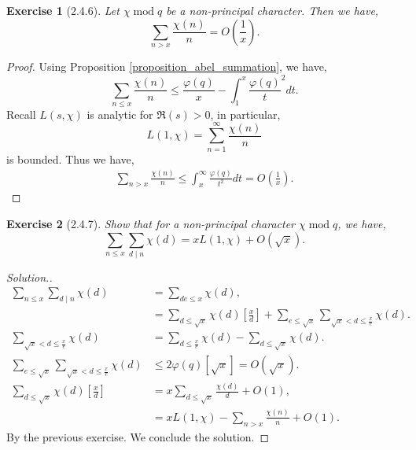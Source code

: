 \documentclass{article}
\newtheorem{exercise}{Exercise}[section]
\DeclareMathOperator{\tmod}{mod}
\begin{document}
\begin{exercise}[2.4.6]
  Let $\chi \tmod q$ be a non-principal character. Then we have,
  \begin{equation*}
    \sum_{n>x}{\frac {\chi(n)} n} = O\left({\frac 1 x}\right).
  \end{equation*}
\end{exercise}
\begin{proof}
  Using Proposition \ref{proposition_abel_summation}, we have,
  \begin{equation*}
    \sum_{n\leq x}{\frac {\chi(n)} n}\leq {\frac {\varphi(q)} x}-\int_1^x {\frac {\varphi(q)} t^2}dt.
  \end{equation*}
  Recall $L(s,\chi)$ is analytic for $\Re(s)>0$, in particular,
  \begin{equation*}
    L(1,\chi)=\sum_{n=1}^\infty{\frac {\chi(n)} n}
  \end{equation*}
  is bounded. Thus we have,
  \begin{align*}
    \sum_{n>x}{\frac {\chi(n)} n}\leq \int_x^\infty {\frac {\varphi(q)} {t^2}}dt = O\left({\frac 1 x}\right).
  \end{align*}
\end{proof}


\begin{exercise}[2.4.7]
  \label{exercise_2.4.7}
  Show that for a non-principal character $\chi\tmod q$, we have,
  \begin{equation*}
    \sum_{n\leq x}\sum_{d\mid n}\chi(d)=xL(1,\chi)+O(\sqrt{x}).
  \end{equation*}
\end{exercise}
\begin{proof}[Solution.]
  \begin{align*}
    \sum_{n\leq x}\sum_{d\mid n}\chi(d)& = \sum_{de\leq x}\chi(d),\\
    & = \sum_{d\leq\sqrt{x}}\chi(d)\left[{\frac x d}\right]+\sum_{e\leq\sqrt{x}}\sum_{\sqrt{x}<d\leq{\frac x e}}\chi(d).\\
    \sum_{\sqrt{x}<d\leq{\frac x e}}\chi(d) & = \sum_{d\leq{\frac x e}}\chi(d)-\sum_{d\leq \sqrt{x}}\chi(d).\\
    \sum_{e\leq\sqrt{x}}\sum_{\sqrt{x}<d\leq{\frac x e}}\chi(d)& \leq 2\varphi(q)[\sqrt{x}]=O(\sqrt{x}).\\
    \sum_{d\leq\sqrt{x}}\chi(d)\left[{\frac x d}\right]& = x\sum_{d\leq\sqrt{x}}{\frac {\chi(d)} d}+O(1),\\
    & = xL(1,\chi)-\sum_{n>x}{\frac {\chi(n)} n}+O(1).
  \end{align*}
  By the previous exercise. We conclude the solution.
\end{proof}
\end{document}
